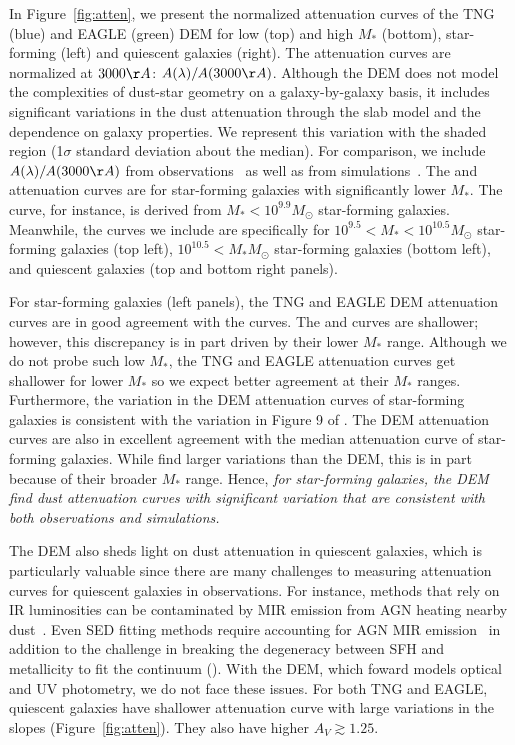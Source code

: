 In Figure~\ref{fig:atten}, we present the normalized attenuation curves of the TNG
(blue) and EAGLE (green) DEM for low (top) and high $M_*$ (bottom),
star-forming (left) and quiescent galaxies (right). The attenuation curves are
normalized at $3000\AA$: $A(\lambda)/A(3000\AA)$. Although the DEM does not
model the complexities of dust-star geometry on a galaxy-by-galaxy basis, it
includes significant variations in the dust attenuation through the slab model
and the dependence on galaxy properties. We represent this variation with the
shaded region (1$\sigma$ standard deviation about the median). For comparison, 
we include $A(\lambda)/A(3000\AA)$ from observations~\citep{calzetti2000, battisti2017, salim2018} 
as well as from simulations~\citep{narayanan2018}. The \cite{calzetti2000} and
\cite{battisti2017} attenuation curves are for star-forming galaxies with
significantly lower $M_*$. The \cite{battisti2017} curve, for instance, is
derived from $M_* < 10^{9.9}M_\odot$ star-forming galaxies. Meanwhile, the
\cite{salim2018} curves we include are specifically for $10^{9.5} < M_* < 10^{10.5}M_\odot$ 
star-forming galaxies (top left), $10^{10.5} < M_*M_\odot$ star-forming
galaxies (bottom left), and quiescent galaxies (top and bottom right panels). 

For star-forming galaxies (left panels), the TNG and EAGLE DEM attenuation
curves are in good agreement with the \cite{salim2018} curves. The
\cite{calzetti2000} and \cite{battisti2017} curves are shallower; however, this
discrepancy is in part driven by their lower $M_*$ range. Although we do not
probe such low $M_*$, the TNG and EAGLE attenuation curves get shallower for lower $M_*$
so we expect better agreement at their $M_*$ ranges. Furthermore, the variation
in the DEM attenuation curves of star-forming galaxies is consistent with the
variation in Figure 9 of \cite{salim2018}. The DEM attenuation
curves are also in excellent agreement with the median attenuation curve of
\cite{narayanan2018} star-forming galaxies. While \cite{narayanan2018} find
larger variations than the DEM, this is in part because of their broader $M_*$ 
range. Hence, \emph{for star-forming galaxies, the DEM find dust attenuation curves with
significant variation that are consistent with both observations and simulations.}

The DEM also sheds light on dust attenuation in quiescent galaxies, which is
particularly valuable since there are many challenges to measuring attenuation
curves for quiescent galaxies in observations. For instance, methods that rely
on IR luminosities can be contaminated by MIR emission from AGN heating nearby
dust~\cite{kirkpatrick2015}. Even SED fitting methods require accounting for
AGN MIR emission~\citep{salim2016, leja2018, salim2018} in addition to the
challenge in breaking the degeneracy between SFH and metallicity to fit the
continuum (). With the DEM, which foward models optical and UV
photometry, we do not face these issues. For both TNG and EAGLE, quiescent
galaxies have shallower attenuation curve with large variations in the slopes
(Figure~\ref{fig:atten}). They also have higher $A_V \gtrsim 1.25$. 

